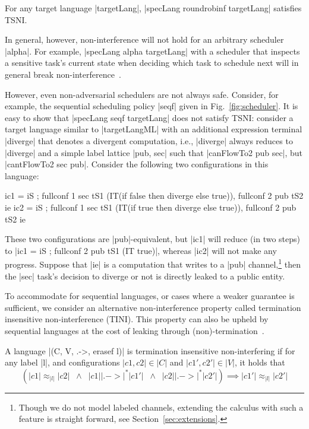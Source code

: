 \begin{theorem}
  \label{thm:rr-tsni}
For any target language |targetLang|, |specLang roundrobinf
targetLang| satisfies TSNI.
\end{theorem}

In general, however, non-interference will not hold for an arbitrary scheduler |alpha|.
%
For example, |specLang alpha targetLang| with a scheduler that inspects a
sensitive task's current state when deciding which task to schedule next
will in general break non-interference~\cite{russo2006securing,BartheRRS07}.
%
%

However, even non-adversarial schedulers are not always safe.
Consider, for example, the sequential scheduling policy |seqf| given in
Fig.~\ref{fig:scheduler}.
%
It is easy to show that |specLang seqf targetLang| does not satisfy
TSNI:
%
consider a target language similar to |targetLangML| with an
additional expression terminal |diverge| that denotes a divergent computation,
i.e., |diverge| always reduces to |diverge| and a simple label lattice |{pub,
sec}| such that |canFlowTo2 pub sec|, but |cantFlowTo2 sec pub|.
Consider the following two configurations in this language:
\begin{code}
ic1 = iS ; fullconf 1 sec tS1 (IT(if false then diverge else true)),  fullconf 2 pub tS2 ie
ic2 = iS ; fullconf 1 sec tS1 (IT(if true then diverge else true)),   fullconf 2 pub tS2 ie
\end{code}
These two configurations are |pub|-equivalent, but |ic1| will reduce
(in two steps)
to |ic1 = iS ; fullconf 2 pub tS1 (IT true)|, whereas |ic2| will not make
any progress.
%
Suppose that |ie| is a computation that writes to a |pub| channel,\footnote{
Though we do not model labeled channels, extending the calculus with such a
feature is straight forward, see Section~\ref{sec:extensions}.}
then the |sec| task's decision to diverge or not is directly leaked to a
public entity.

%
To accommodate for sequential languages, or cases where a weaker guarantee
is sufficient, we consider an alternative non-interference property called termination insensitive
non-interference (TINI).  This property can also be upheld by sequential languages at the cost
of leaking through (non)-termination~\cite{Askarov:2008}.
%
\begin{definition}
  A language |(C, V, .->, erasef l)| is termination
  insensitive non-interfering if for any label |l|, and configurations
  $|c1, c2|\in|C|$ and $|c1', c2'|\in|V|$, it holds that
  \[
    (|c1| \approx_{|l|} |c2|
    \;\;\land\;\;
    |c1| |.->|^* |c1'|
    \;\;\land\;\;
    |c2| |.->|^* |c2'|)
    \implies
    |c1'| \approx_{|l|} |c2'|
  \]
\end{definition}

